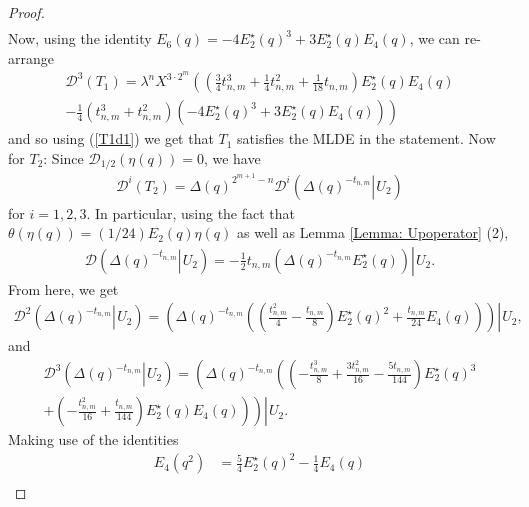 \documentclass[10pt,a4paper]{amsart}
\numberwithin{equation}{section}
\theoremstyle{definition}
\newcommand{\haupt}{\lambda}
\newcommand{\utwo}[1]{\left. #1 \right\rvert \hspace{1pt} U_{2}}
\begin{document}
\begin{proof}
\begin{align*}
   \end{align*}
   Now, using the identity $E_{6}(q) = -4 E_{2}^{\star}(q)^{3} + 3 E_{2}^{\star}(q) E_{4}(q)$, we can re-arrange
   \begin{multline*}
       \mathcal{D}^{3}(T_{1}) = \haupt^{n} X^{3 \cdot 2^{m}} \left( \left( \frac{3}{4} t_{n,m}^{3} + \frac{1}{4} t_{n,m}^{2} + \frac{1}{18} t_{n,m} \right) E_{2}^{\star}(q)E_{4}(q) \right. \\ \left. - \frac{1}{4}\left( t_{n,m}^{3} + t_{n,m}^{2} \right) \left( -4 E_{2}^{\star}(q)^{3} + 3 E_{2}^{\star}(q)E_{4}(q) \right) \right)
   \end{multline*}
   and so using (\ref{T1d1}) we get that $T_{1}$ satisfies the MLDE in the statement. Now for $T_{2}$: Since $\mathcal{D}_{1/2}(\eta(q)) = 0$, we have
   \begin{align*}
       \mathcal{D}^{i}(T_{2}) = \Delta (q)^{2^{m+1}-n} \mathcal{D}^{i} \left( \utwo{  \Delta (q)^{-t_{n,m}} } \right)
   \end{align*}
   for $i = 1,2,3$. In particular, using the fact that $\theta (\eta (q)) = (1/24) E_{2}(q) \eta (q)$ as well as Lemma \ref{Lemma: Upoperator} (2),
   \begin{align}
        \mathcal{D} \left. \left( \Delta (q)^{-t_{n,m}} \right\rvert \hspace{1pt} U_{2} \right) = - \frac{1}{2} t_{n,m} \utwo{ \left( \Delta (q)^{- t_{n,m}} E_{2}^{\star}(q) \right) }. \label{T2d1}
   \end{align}
   From here, we get
   \begin{align*}
       \mathcal{D}^{2} \left( \utwo{ \Delta (q)^{-t_{n,m}} } \right) = \utwo{ \left( \Delta (q)^{-t_{n,m}} \left( \left( \frac{ t_{n,m}^{2}}{4} - \frac{ t_{n,m}}{8} \right) E_{2}^{\star}(q)^{2} + \frac{ t_{n,m}}{24} E_{4}(q) \right) \right) },
   \end{align*}
   and 
   \begin{multline*}
       \mathcal{D}^{3} \left( \utwo{ \Delta (q)^{- t_{n,m}} } \right) = \left. \left( \Delta (q)^{- t_{n,m}} \left( \left( - \frac{t_{n,m}^{3}}{8} + \frac{3 t_{n,m}^{2}}{16} - \frac{5 t_{n,m}}{144} \right) E_{2}^{\star}(q)^{3} \right.\right. \right. \\
       + \utwo{ \left. \left. \left( - \frac{t_{n,m}^{2}}{16} + \frac{t_{n,m}}{144} \right) E_{2}^{\star}(q) E_{4}(q) \right) \right) }.
   \end{multline*}
   Making use of the identities
       \begin{align*}
           E_{4}(q^{2}) &= \frac{5}{4} E_{2}^{\star}(q)^{2} - \frac{1}{4} E_{4}(q) \\

\end{align*}
\end{proof}
\end{document}
